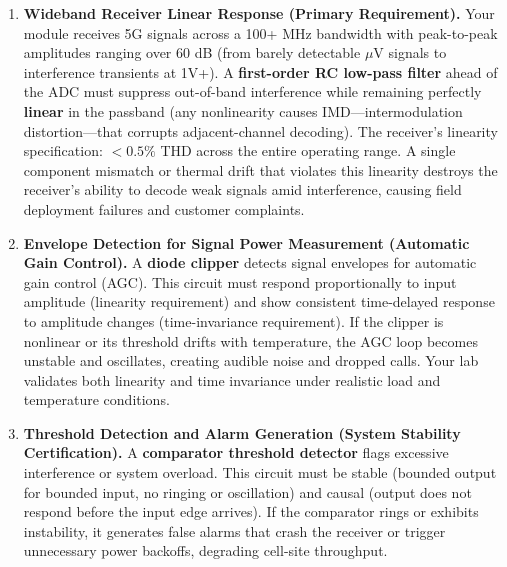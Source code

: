 \documentclass[11pt,letterpaper]{article}
\begin{document}
\begin{enumerate}[leftmargin=0.4in]
    \item \textbf{Wideband Receiver Linear Response (Primary Requirement).} Your module receives 5G signals across a 100+ MHz bandwidth with peak-to-peak amplitudes ranging over 60 dB (from barely detectable $\mu$V signals to interference transients at 1V+). A \textbf{first-order RC low-pass filter} ahead of the ADC must suppress out-of-band interference while remaining perfectly \textbf{linear} in the passband (any nonlinearity causes IMD—intermodulation distortion—that corrupts adjacent-channel decoding). The receiver's linearity specification: $<0.5\%$ THD across the entire operating range. A single component mismatch or thermal drift that violates this linearity destroys the receiver's ability to decode weak signals amid interference, causing field deployment failures and customer complaints.

    \item \textbf{Envelope Detection for Signal Power Measurement (Automatic Gain Control).} A \textbf{diode clipper} detects signal envelopes for automatic gain control (AGC). This circuit must respond proportionally to input amplitude (linearity requirement) and show consistent time-delayed response to amplitude changes (time-invariance requirement). If the clipper is nonlinear or its threshold drifts with temperature, the AGC loop becomes unstable and oscillates, creating audible noise and dropped calls. Your lab validates both linearity and time invariance under realistic load and temperature conditions.

    \item \textbf{Threshold Detection and Alarm Generation (System Stability Certification).} A \textbf{comparator threshold detector} flags excessive interference or system overload. This circuit must be stable (bounded output for bounded input, no ringing or oscillation) and causal (output does not respond before the input edge arrives). If the comparator rings or exhibits instability, it generates false alarms that crash the receiver or trigger unnecessary power backoffs, degrading cell-site throughput.
\end{enumerate}
\end{document}
